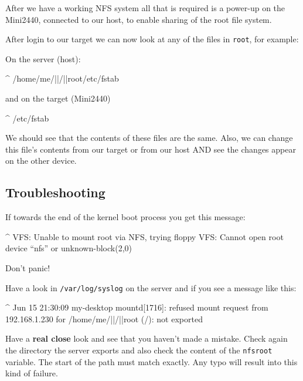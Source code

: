 After we have a working NFS system all that is required is a power-up on the
Mini2440, connected to our host, to enable sharing of the root file system.

After login to our target we can now look at any of the files in
\texttt{\ptxdistPlatformDir root}, for example:

On the server (host):

\begin{ptxshell}[escapechar=|]{^}
/home/me/|\ptxdistBSPName |/|\ptxdistPlatformDir |root/etc/fstab
\end{ptxshell}

and on the target (Mini2440)

\begin{ptxshell}[escapechar=|]{^}
/etc/fstab
\end{ptxshell}

We should see that the contents of these files are the same. Also, we can
change this file’s contents from our target or from our host AND see the
changes appear on the other device.

\subsection{Troubleshooting}

If towards the end of the kernel boot process you get this message:

\begin{ptxshell}[escapechar=|]{^}
VFS:  Unable to mount root via NFS, trying floppy
VFS:  Cannot open root device “nfs” or unknown-block(2,0)
\end{ptxshell}

Don’t panic!

Have a look in \texttt{/var/log/syslog} on the server and if you see a
message like this:

\begin{ptxshell}[escapechar=|]{^}
Jun 15 21:30:09 my-desktop mountd[1716]: refused mount request from 192.168.1.230 for
/home/me/|\ptxdistBSPName |/|\ptxdistPlatformDir |root (/): not exported
\end{ptxshell}

Have a \textbf{real close} look and see that you haven’t made a mistake. Check
again the directory the server exports and also check the content of the \texttt{nfsroot}
variable. The start of the path must match exactly. Any typo will result into this
kind of failure.
